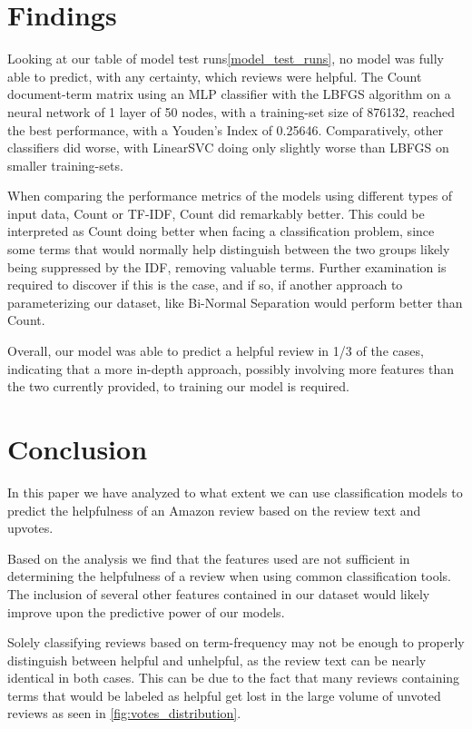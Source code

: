 \documentclass[twoside,twocolumn]{article}
\begin{document}

\section{Findings}

Looking at our table of model test runs\ref{model_test_runs}, no model was fully able to predict, with any certainty, which reviews were helpful. The Count document-term matrix using an MLP classifier with the LBFGS algorithm on a neural network of 1 layer of 50 nodes, with a training-set size of 876132, reached the best performance, with a Youden’s Index of 0.25646. Comparatively, other classifiers did worse, with LinearSVC doing only slightly worse than LBFGS on smaller training-sets.

When comparing the performance metrics of the models using different types of input data, Count or TF-IDF, Count did remarkably better. This could be interpreted as Count doing better when facing a classification problem, since some terms that would normally help distinguish between the two groups likely being suppressed by the IDF, removing valuable terms. Further examination is required to discover if this is the case, and if so, if another approach to parameterizing our dataset, like Bi-Normal Separation\cite{bi-normalSeparation} would perform better than Count.

Overall, our model was able to predict a helpful review in 1/3 of the cases, indicating that a more in-depth approach, possibly involving more features than the two currently provided, to training our model is required.

\section{Conclusion}
In this paper we have analyzed to what extent we can use classification models to predict the helpfulness of an Amazon review based on the review text and upvotes.

Based on the analysis we find that the features used are not sufficient in determining the helpfulness of a review when using common classification tools. The inclusion of several other features contained in our dataset would likely improve upon the predictive power of our models.

Solely classifying reviews based on term-frequency may not be enough to properly distinguish between helpful and unhelpful, as the review text can be nearly identical in both cases. This can be due to the fact that many reviews containing terms that would be labeled as helpful get lost in the large volume of unvoted reviews as seen in \figurename{\ref{fig:votes_distribution}}.
\end{document}
